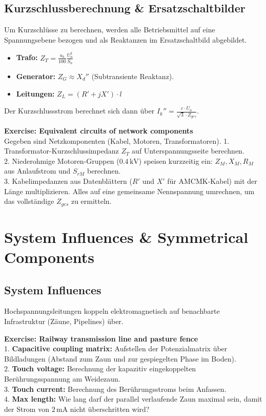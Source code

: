 \documentclass[11pt, a4paper]{article}
\begin{document}
\subsection{Kurzschlussberechnung \& Ersatzschaltbilder}
Um Kurzschlüsse zu berechnen, werden alle Betriebsmittel auf eine Spannungsebene bezogen und als Reaktanzen im Ersatzschaltbild abgebildet.
\begin{itemize}
    \item \textbf{Trafo:} $Z_T = \frac{u_k}{100} \frac{U_n^2}{S_n}$
    \item \textbf{Generator:} $Z_G \approx X_d''$ (Subtransiente Reaktanz).
    \item \textbf{Leitungen:} $Z_L = (R' + jX') \cdot l$
\end{itemize}
Der Kurzschlussstrom berechnet sich dann über $I_k'' = \frac{c \cdot U_n}{\sqrt{3} \cdot Z_{ges}}$.

\begin{tcolorbox}[colback=yellow!5, title=\textbf{Übungsbeispiel (aus Short-circuits.pdf S. 85, 86)}]
\textbf{Exercise: Equivalent circuits of network components}\\
Gegeben sind Netzkomponenten (Kabel, Motoren, Transformatoren).
1. Transformator-Kurzschlussimpedanz $Z_T$ auf Unterspannungsseite berechnen. \\
2. Niederohmige Motoren-Gruppen ($0.4\,\text{kV}$) speisen kurzzeitig ein: $Z_M, X_M, R_M$ aus Anlaufstrom und $S_{rM}$ berechnen.\\
3. Kabelimpedanzen aus Datenblättern ($R'$ und $X'$ für AMCMK-Kabel) mit der Länge multiplizieren. Alles auf eine gemeinsame Nennspannung umrechnen, um das vollständige $Z_{ges}$ zu ermitteln.
\end{tcolorbox}

\section{System Influences \& Symmetrical Components}

\subsection{System Influences}
Hochspannungsleitungen koppeln elektromagnetisch auf benachbarte Infrastruktur (Zäune, Pipelines) über.
\begin{tcolorbox}[colback=yellow!5, title=\textbf{Übungsbeispiel (aus Power System Influences S. 18, 19)}]
\textbf{Exercise: Railway transmission line and pasture fence}\\
1. \textbf{Capacitive coupling matrix:} Aufstellen der Potenzialmatrix über Bildladungen (Abstand zum Zaun und zur gespiegelten Phase im Boden). \\
2. \textbf{Touch voltage:} Berechnung der kapazitiv eingekoppelten Berührungsspannung am Weidezaun. \\
3. \textbf{Touch current:} Berechnung des Berührungsstroms beim Anfassen. \\
4. \textbf{Max length:} Wie lang darf der parallel verlaufende Zaun maximal sein, damit der Strom von $2\,\text{mA}$ nicht überschritten wird?
\end{tcolorbox}
\end{document}
